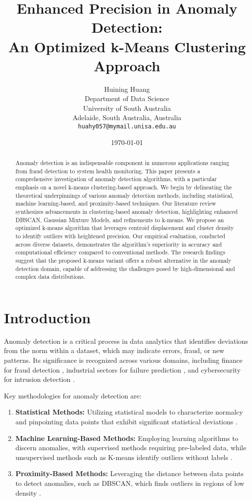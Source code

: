\documentclass[sigplan,screen]{acmart}
\title{Enhanced Precision in Anomaly Detection: \\ An Optimized k-Means Clustering Approach}
\author{
  Huining Huang \\
  Department of Data Science \\
  University of South Australia \\
  Adelaide, South Australia, Australia \\
  \texttt{huahy057@mymail.unisa.edu.au}
}
\date{\today} %
\begin{document}
\maketitle %

\begin{abstract}
    Anomaly detection is an indispensable component in numerous applications ranging from fraud detection to system health monitoring. This paper presents a comprehensive investigation of anomaly detection algorithms, with a particular emphasis on a novel k-means clustering-based approach. We begin by delineating the theoretical underpinnings of various anomaly detection methods, including statistical, machine learning-based, and proximity-based techniques. Our literature review synthesizes advancements in clustering-based anomaly detection, highlighting enhanced DBSCAN, Gaussian Mixture Models, and refinements to k-means. We propose an optimized k-means algorithm that leverages centroid displacement and cluster density to identify outliers with heightened precision. Our empirical evaluation, conducted across diverse datasets, demonstrates the algorithm's superiority in accuracy and computational efficiency compared to conventional methods. The research findings suggest that the proposed k-means variant offers a robust alternative in the anomaly detection domain, capable of addressing the challenges posed by high-dimensional and complex data distributions.
    \end{abstract}
    

    \section{Introduction}

    Anomaly detection is a critical process in data analytics that identifies deviations from the norm within a dataset, which may indicate errors, fraud, or new patterns. Its significance is recognized across various domains, including finance for fraud detection \cite{ref11}, industrial sectors for failure prediction \cite{ref12}, and cybersecurity for intrusion detection \cite{ref13}.
    
    Key methodologies for anomaly detection are:
    
    \begin{enumerate}
        \item \textbf{Statistical Methods:} Utilizing statistical models to characterize normalcy and pinpointing data points that exhibit significant statistical deviations \cite{ref14}.
        \item \textbf{Machine Learning-Based Methods:} Employing learning algorithms to discern anomalies, with supervised methods requiring pre-labeled data, while unsupervised methods such as K-means identify outliers without labels \cite{ref15}.
        \item \textbf{Proximity-Based Methods:} Leveraging the distance between data points to detect anomalies, such as DBSCAN, which finds outliers in regions of low density \cite{ref16}.
    \end{enumerate}
    
\end{document}
